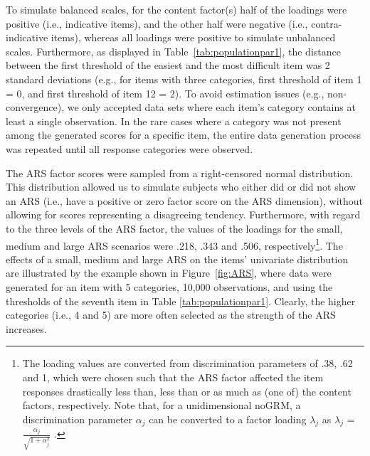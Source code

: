 \documentclass[a4paper,man,natbib]{apa6}
\begin{document}
\begin{linenumbers}
To simulate balanced scales, for the content factor(s) half of the loadings were positive (i.e., indicative items), and the other half were negative (i.e., contra-indicative items), whereas all loadings were positive to simulate unbalanced scales. Furthermore, as displayed in Table~\ref{tab:populationpar1}, the distance between the first threshold of the easiest and the most difficult item was 2 standard deviations (e.g., for items with three categories, first threshold of item 1 = 0, and first threshold of item 12 = 2). %
To avoid estimation issues (e.g., non-convergence), we only accepted data sets where each item's category contains at least a single observation. In the rare cases where a category was not present among the generated scores for a specific item, the entire data generation process was repeated until all response categories were observed. 

The ARS factor scores were sampled from a right-censored normal distribution. This distribution allowed us to simulate subjects who either did or did not show an ARS (i.e., have a positive or zero factor score on the ARS dimension), without allowing for scores representing a disagreeing tendency.
Furthermore, with regard to the three levels of the ARS factor, the values of the loadings for the small, medium and large ARS scenarios were .218, .343 and .506, respectively\footnote{The loading values are converted from discrimination parameters of .38, .62 and 1, which were chosen such that the ARS factor affected the item responses drastically less than, less than or as much as (one of) the content factors, respectively. Note that, for a unidimensional noGRM, a discrimination parameter $\alpha_{j}$ can be converted to a factor loading $\lambda_{j}$ as $\lambda_{j}$ = $\frac{\alpha_{j}}{\sqrt{1+\alpha_{j}^{2}}}$ \citep{kamata2008note}.}. 
The effects of a small, medium and large ARS on the items' univariate distribution are illustrated by the example shown in Figure~\ref{fig:ARS}, where data were generated for an item with 5 categories, 10,000 observations, and using the thresholds of the seventh item in Table \ref{tab:populationpar1}. Clearly, the higher categories (i.e., 4 and 5) are more often selected as the strength of the ARS increases.



\end{linenumbers}
\end{document}
